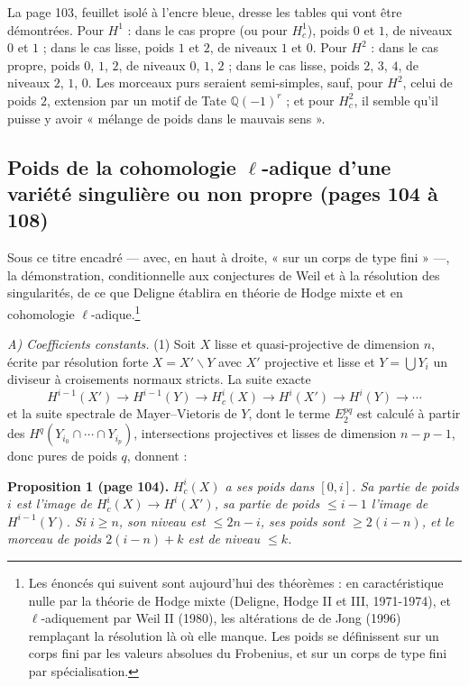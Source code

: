\documentclass[11pt,a4paper]{article}
\begin{document}
La page 103, feuillet isolé à l'encre bleue, dresse les tables qui vont être
démontrées. Pour $H^{1}$ : dans le cas propre (ou pour $H^{1}_{c}$), poids $0$ et
$1$, de niveaux $0$ et $1$ ; dans le cas lisse, poids $1$ et $2$, de niveaux $1$ et
$0$. Pour $H^{2}$ : dans le cas propre, poids $0$, $1$, $2$, de niveaux $0$, $1$,
$2$ ; dans le cas lisse, poids $2$, $3$, $4$, de niveaux $2$, $1$, $0$. Les morceaux
purs seraient semi-simples, sauf, pour $H^{2}$, celui de poids $2$, extension par
un motif de Tate $\mathbb{Q}(-1)^{r}$ ; et pour $H^{2}_{c}$, il semble qu'il puisse
y avoir « mélange de poids dans le mauvais sens ».

\subsection*{Poids de la cohomologie $\ell$-adique d'une variété singulière ou non propre (pages 104 à 108)}

Sous ce titre encadré --- avec, en haut à droite, « sur un corps de type fini »
---, la démonstration, conditionnelle aux conjectures de Weil et à la résolution
des singularités, de ce que Deligne établira en théorie de Hodge mixte et en
cohomologie $\ell$-adique.\footnote{Les énoncés qui suivent sont aujourd'hui des
théorèmes : en caractéristique nulle par la théorie de Hodge mixte (Deligne,
Hodge II et III, 1971-1974), et $\ell$-adiquement par Weil II (1980), les
altérations de de Jong (1996) remplaçant la résolution là où elle manque. Les
poids se définissent sur un corps fini par les valeurs absolues du Frobenius, et
sur un corps de type fini par spécialisation.}

\emph{A) Coefficients constants.} (1) Soit $X$ lisse et quasi-projective de
dimension $n$, écrite par résolution forte $X = X' \smallsetminus Y$ avec $X'$
projective et lisse et $Y = \bigcup Y_{i}$ un diviseur à croisements normaux
stricts. La suite exacte
\[
H^{i-1}(X') \to H^{i-1}(Y) \to H^{i}_{c}(X) \to H^{i}(X') \to H^{i}(Y) \to \cdots
\]
et la suite spectrale de Mayer--Vietoris de $Y$, dont le terme $E_{2}^{pq}$ est
calculé à partir des $H^{q}(Y_{i_{0}} \cap \cdots \cap Y_{i_{p}})$, intersections
projectives et lisses de dimension $n-p-1$, donc pures de poids $q$, donnent :

\textbf{Proposition 1 (page 104).} \emph{$H^{i}_{c}(X)$ a ses poids dans
$[0, i]$. Sa partie de poids $i$ est l'image de $H^{i}_{c}(X) \to H^{i}(X')$, sa
partie de poids $\leqslant i-1$ l'image de $H^{i-1}(Y)$. Si $i \geqslant n$, son
niveau est $\leqslant 2n-i$, ses poids sont $\geqslant 2(i-n)$, et le morceau de
poids $2(i-n) + k$ est de niveau $\leqslant k$.}
\end{document}
